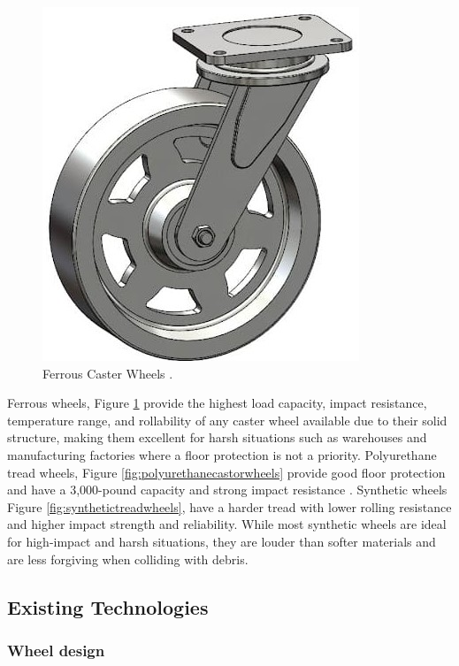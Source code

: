 \begin{figure}[htbp]
\includegraphics[scale=0.3]{Figures/ferrous-caster-wheel.jpg}
\centering
\caption[Ferrous Caster Wheels] {Ferrous Caster Wheels	 \cite{noauthor_caster_nodate}.}
\label{fig:ferrouscasterwheels}
\end{figure}

Ferrous wheels, Figure \ref{fig:ferrouscasterwheels} provide the highest load capacity, impact resistance, temperature range, and rollability of any caster wheel available due to their solid structure, making them excellent for harsh situations such as warehouses and manufacturing factories where a floor protection is not a priority.
Polyurethane tread wheels, Figure \ref{fig:polyurethanecastorwheels} provide good floor protection and have a 3,000-pound capacity and strong impact resistance \cite{noauthor_caster_nodate}.
Synthetic wheels Figure \ref{fig:synthetictreadwheels}, have a harder tread with lower rolling resistance and higher impact strength and reliability.
While most synthetic wheels are ideal for high-impact and harsh situations, they are louder than softer materials and are less forgiving when colliding with debris. 

\subsection{Existing Technologies}

\subsubsection{Wheel design}

